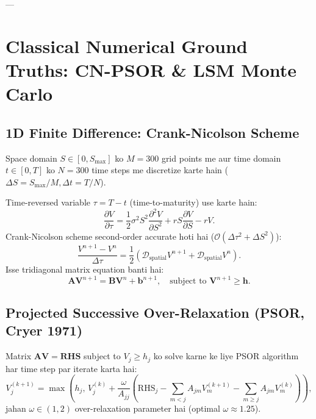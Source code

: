 \documentclass[11pt,a4paper,oneside]{book}
\begin{document}
---

\chapter{Classical Numerical Ground Truths: CN-PSOR \& LSM Monte Carlo}

\section{1D Finite Difference: Crank-Nicolson Scheme}
Space domain $S \in [0, S_{\max}]$ ko $M=300$ grid points me aur time domain $t \in [0, T]$ ko $N=300$ time steps me discretize karte hain ($\Delta S = S_{\max}/M, \Delta t = T/N$).

Time-reversed variable $\tau = T - t$ (time-to-maturity) use karte hain:
\begin{equation}
    \frac{\partial V}{\partial \tau} = \frac{1}{2}\sigma^2 S^2 \frac{\partial^2 V}{\partial S^2} + r S \frac{\partial V}{\partial S} - r V.
\end{equation}
Crank-Nicolson scheme second-order accurate hoti hai ($\mathcal{O}(\Delta \tau^2 + \Delta S^2)$):
\begin{equation}
    \frac{V^{n+1} - V^n}{\Delta \tau} = \frac{1}{2}\left( \mathcal{D}_{\text{spatial}} V^{n+1} + \mathcal{D}_{\text{spatial}} V^n \right).
\end{equation}
Isse tridiagonal matrix equation banti hai:
\begin{equation}
    \mathbf{A} \mathbf{V}^{n+1} = \mathbf{B} \mathbf{V}^n + \mathbf{b}^{n+1}, \quad \text{subject to } \mathbf{V}^{n+1} \ge \mathbf{h}.
\end{equation}

\section{Projected Successive Over-Relaxation (PSOR, Cryer 1971)}
Matrix $\mathbf{A} \mathbf{V} = \mathbf{RHS}$ subject to $V_j \ge h_j$ ko solve karne ke liye PSOR algorithm har time step par iterate karta hai:
\begin{equation}
    V_j^{(k+1)} = \max \left( h_j, \, V_j^{(k)} + \frac{\omega}{A_{jj}} \left( \text{RHS}_j - \sum_{m < j} A_{jm} V_m^{(k+1)} - \sum_{m \ge j} A_{jm} V_m^{(k)} \right) \right),
\end{equation}
jahan $\omega \in (1, 2)$ over-relaxation parameter hai (optimal $\omega \approx 1.25$).
\end{document}
